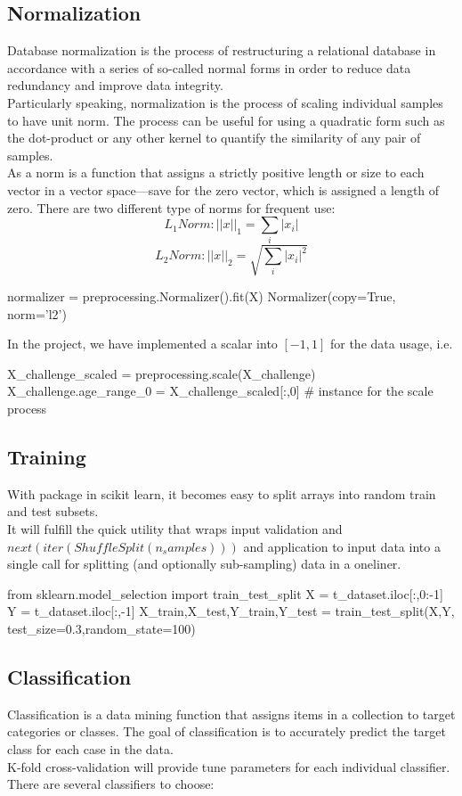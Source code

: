 \documentclass[sigconf]{acmart}
\begin{document}
\subsection{Normalization}
Database normalization is the process of restructuring a relational database in accordance with a series of so-called normal forms in order to reduce data redundancy and improve data integrity.\\ 
\indent
Particularly speaking, normalization is the process of scaling individual samples to have unit norm. The process can be useful for using a quadratic form such as the dot-product or any other kernel to quantify the similarity of any pair of samples.\\
\indent
As a norm is a function that assigns a strictly positive length or size to each vector in a vector space—save for the zero vector, which is assigned a length of zero. There are two different type of norms for frequent use:
$$L_1 Norm: ||x||_1 = \sum_i |x_i|$$
$$L_2 Norm: ||x||_2 = \sqrt{\sum_i |x_i|^2}$$
\begin{python}
normalizer = preprocessing.Normalizer().fit(X) 
Normalizer(copy=True, norm='l2')
\end{python}
\indent
In the project, we have implemented a scalar into $[-1, 1]$ for the data usage, i.e.\\
\begin{python}
X_challenge_scaled = preprocessing.scale(X_challenge)
X_challenge.age_range_0 = X_challenge_scaled[:,0]
# instance for the scale process
\end{python}
\subsection{Training}
With package in scikit learn, it becomes easy to split arrays into random train and test subsets.\\
\indent
It will fulfill the quick utility that wraps input validation and $next(iter(ShuffleSplit(n_samples)))$ and application to input data into a single call for splitting (and optionally sub-sampling) data in a oneliner.\\
\begin{python}
from sklearn.model_selection import train_test_split
X = t_dataset.iloc[:,0:-1]
Y = t_dataset.iloc[:,-1]
X_train,X_test,Y_train,Y_test = train_test_split(X,Y,
test_size=0.3,random_state=100)
\end{python}
\subsection{Classification}
Classification is a data mining function that assigns items in a collection to target categories or classes. The goal of classification is to accurately predict the target class for each case in the data.\\
\indent
K-fold cross-validation will provide tune parameters for each individual classifier. There are several classifiers to choose:\\
\end{document}
